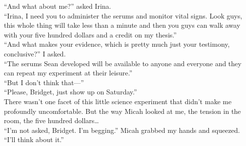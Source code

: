 \documentclass[a5paper]{scrartcl}
\def\asterism{\par\vspace{1em}{\centering\scalebox{1.5}{%
  \stackon[-0.5pt]{\bfseries*~*}{\bfseries*}}\par}\vspace{.5em}\par}
\begin{document}
\enquote{And what about me?} asked Irina.\\
\enquote{Irina, I need you to administer the serums and monitor vital signs. Look guys, this whole thing will take less than a minute and then you guys can walk away with your five hundred dollars and a credit on my thesis.}\\
\enquote{And what makes your evidence, which is pretty much just your testimony, conclusive?} I asked.\\
\enquote{The serums Sean developed will be available to anyone and everyone and they can repeat my experiment at their leisure.}\\
\enquote{But I don't think that---}\\
\enquote{Please, Bridget, just show up on Saturday.}\\
There wasn't one facet of this little science experiment that didn't make me profoundly uncomfortable. But the way Micah looked at me, the tension in the room, the five hundred dollars\dots\\
\enquote{I'm not asked, Bridget. I'm begging.} Micah grabbed my hands and squeezed.\\
\enquote{I'll think about it.}

\asterism
\end{document}

